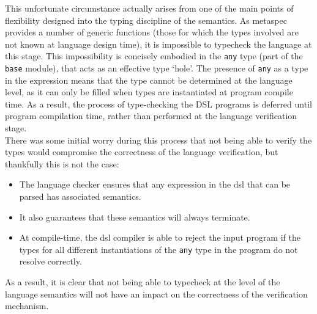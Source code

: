 This unfortunate circumstance actually arises from one of the main points of flexibility designed into the typing discipline of the semantics. 
As \gls{metaspec} provides a number of generic functions (those for which the types involved are not known at language design time), it is impossible to typecheck the language at this stage.
This impossibility is concisely embodied in the \texttt{any} type (part of the \texttt{base} module), that acts as an effective type `hole'.
The presence of \texttt{any} as a type in the expression means that the type cannot be determined at the language level, as it can only be filled when types are instantiated at program compile time.
As a result, the process of type-checking the DSL programs is deferred until program compilation time, rather than performed at the language verification stage.\\

There was some initial worry during this process that not being able to verify the types would compromise the correctness of the language verification, but thankfully this is not the case:
\begin{itemize}
    \item The language checker ensures that any expression in the \gls{dsl} that can be parsed has associated semantics.
    \item It also guarantees that these semantics will always terminate.
    \item At compile-time, the \gls{dsl} compiler is able to reject the input program if the types for all different instantiations of the \texttt{any} type in the program do not resolve correctly. 
\end{itemize}

As a result, it is clear that not being able to typecheck at the level of the language semantics will not have an impact on the correctness of the verification mechanism.


